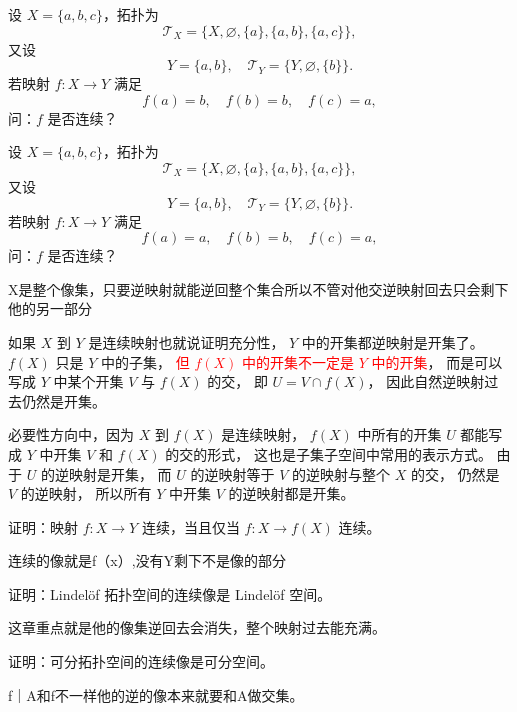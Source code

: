 \begin{homework}[8]
设 $X=\{a,b,c\}$，拓扑为 
\[
\mathcal{T}_X=\{X,\varnothing,\{a\},\{a,b\},\{a,c\}\},
\]
又设
\[
Y=\{a,b\},\quad 
\mathcal{T}_Y=\{Y,\varnothing,\{b\}\}.
\]
若映射 $f:X\to Y$ 满足 
\[
f(a)=b,\quad f(b)=b,\quad f(c)=a,
\]
问：$f$ 是否连续？
\end{homework}

\begin{homework}[9]
设 $X=\{a,b,c\}$，拓扑为 
\[
\mathcal{T}_X=\{X,\varnothing,\{a\},\{a,b\},\{a,c\}\},
\]
又设
\[
Y=\{a,b\},\quad 
\mathcal{T}_Y=\{Y,\varnothing,\{b\}\}.
\]
若映射 $f:X\to Y$ 满足 
\[
f(a)=a,\quad f(b)=b,\quad f(c)=a,
\]
问：$f$ 是否连续？
\end{homework}
\begin{dxtips}
    X是整个像集，只要逆映射就能逆回整个集合所以不管对他交逆映射回去只会剩下他的另一部分
\end{dxtips}
\begin{dxtips}
    如果 $X$ 到 $Y$ 是连续映射也就说证明充分性，
$Y$ 中的开集都逆映射是开集了。
$f(X)$ 只是 $Y$ 中的子集，
\textcolor{red}{但 $f(X)$ 中的开集不一定是 $Y$ 中的开集}，
而是可以写成 $Y$ 中某个开集 $V$ 与 $f(X)$ 的交，
即 $U=V\cap f(X)$，
因此自然逆映射过去仍然是开集。

必要性方向中，因为 $X$ 到 $f(X)$ 是连续映射，
$f(X)$ 中所有的开集 $U$ 都能写成
$Y$ 中开集 $V$ 和 $f(X)$ 的交的形式，
这也是子集子空间中常用的表示方式。
由于 $U$ 的逆映射是开集，
而 $U$ 的逆映射等于 $V$ 的逆映射与整个 $X$ 的交，
仍然是 $V$ 的逆映射，
所以所有 $Y$ 中开集 $V$ 的逆映射都是开集。
\end{dxtips}
\begin{homework}[12]
证明：映射 $f:X\to Y$ 连续，当且仅当 $f:X\to f(X)$ 连续。
\end{homework}
\begin{dxtips}
    连续的像就是f（x）,没有Y剩下不是像的部分
\end{dxtips}
\begin{homework}[3]
证明：Lindelöf 拓扑空间的连续像是 Lindelöf 空间。
\end{homework}
\begin{dxtips}
    这章重点就是他的像集逆回去会消失，整个映射过去能充满。
\end{dxtips}
\begin{homework}[4]
证明：可分拓扑空间的连续像是可分空间。
\end{homework}
\begin{dxtips}
    f｜A和f不一样他的逆的像本来就要和A做交集。
\end{dxtips}
